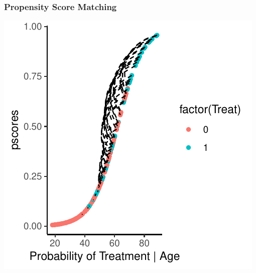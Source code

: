 \documentclass[xcolor=x11names,compress]{beamer}\usepackage[]{graphicx}\usepackage[]{color}
\makeatletter
\def\maxwidth{ %
  \ifdim\Gin@nat@width>\linewidth
    \linewidth
  \else
    \Gin@nat@width
  \fi
}
\newenvironment{knitrout}{}{} %
\renewcommand{\(}{\begin{columns}}
\renewcommand{\)}{\end{columns}}
\newcommand{\<}[1]{\begin{column}{#1}}
\renewcommand{\>}{\end{column}}
\makeatother
\begin{document}
\begin{frame}
\frametitle{Propensity Score Matching}
\begin{center}
\begin{knitrout}
\color{fgcolor}
\includegraphics[width=\maxwidth]{figure/pscore_matching_4-1} 

\end{knitrout}
\end{center}
\end{frame}
\end{document}
